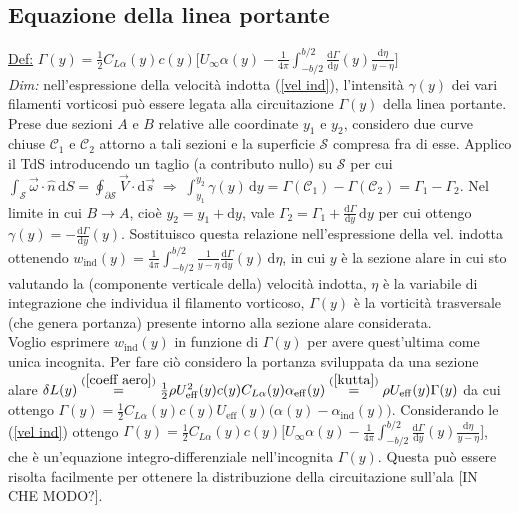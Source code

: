 \documentclass[11pt,a4paper]{report}
\newcommand{\de}{\mathrm d}
\newcommand{\sz}[1]{\scriptsize #1\normalsize}
\begin{document}
		\subsection{Equazione della linea portante}
		\underline{Def:} $\Gamma(y)=\frac 12C_{L\alpha}(y)c(y)\big[U_\infty\alpha(y)-\frac{1}{4\pi}\int_{-b/2}^{b/2}\frac{\de \Gamma}{\de y}(y)\frac{\de \eta}{y-\eta}\big]$\\
		\textit{Dim:} nell'espressione della velocità indotta (\ref{vel ind}), l'intensità $\gamma(y)$ dei vari filamenti vorticosi può essere legata alla circuitazione $\Gamma(y)$ della linea portante. Prese due sezioni $A$ e $B$ relative alle coordinate $y_1$ e $y_2$, considero due curve chiuse $\mathcal C_1$ e $\mathcal C_2$ attorno a tali sezioni e la superficie $\mathcal S$ compresa fra di esse. Applico il TdS introducendo un taglio (a contributo nullo) su $\mathcal S$ per cui $\int_\mathcal S\vec\omega\cdot\hat n\,\de S=\oint_{\partial\mathcal S}\vec V\cdot\de \vec s\;\Rightarrow\;\int_{y_1}^{y_2}\gamma(y)\,\de y=\Gamma(\mathcal C_1)-\Gamma(\mathcal C_2)=\Gamma_1-\Gamma_2$. Nel limite in cui $B\to A$, cioè $y_2=y_1+\de y$, vale $\Gamma_2=\Gamma_1+\frac{\de \Gamma}{\de y}\,\de y$ per cui ottengo $\gamma(y)=-\frac{\de \Gamma}{\de y}(y)$. Sostituisco questa relazione nell'espressione  della vel. indotta ottenendo $w_\mathrm{ind}(y)=\frac{1}{4\pi}\int_{-b/2}^{b/2}\frac{1}{y-\eta}\frac{\de \Gamma}{\de y}(y)\,\de \eta$, in cui $y$ è la sezione alare in cui sto valutando la \sz{(componente verticale della)} velocità indotta, $\eta$ è la variabile di integrazione che individua il filamento vorticoso, $\Gamma(y)$ è la vorticità trasversale (che genera portanza) presente intorno alla sezione alare considerata.\\
Voglio esprimere $w_\mathrm{ind}(y)$ in funzione di $\Gamma(y)$ per avere quest'ultima come unica incognita. Per fare ciò considero la portanza sviluppata da una sezione alare $\delta L(y)\overset{(\ref{coeff aero})}{=}\frac 12\rho U_\mathrm{eff}^2(y)c(y)C_{L\alpha}(y)\alpha_\mathrm{eff}(y)\overset{(\ref{kutta})}{=}\rho U_\mathrm{eff}(y)\Gamma(y)$ da cui ottengo $\Gamma(y)=\frac 12C_{L\alpha}(y)c(y)U_\mathrm{eff}(y)\big(\alpha(y)-\alpha_\mathrm{ind}(y)\big)$. Considerando le (\ref{vel ind}) ottengo $\Gamma(y)=\frac 12C_{L\alpha}(y)c(y)\big[U_\infty\alpha(y)-\frac{1}{4\pi}\int_{-b/2}^{b/2}\frac{\de \Gamma}{\de y}(y)\frac{\de \eta}{y-\eta}\big]$, che è un'equazione integro-differenziale nell'incognita $\Gamma(y)$. Questa può essere risolta facilmente per ottenere la distribuzione della circuitazione sull'ala [IN CHE MODO?].
\end{document}
